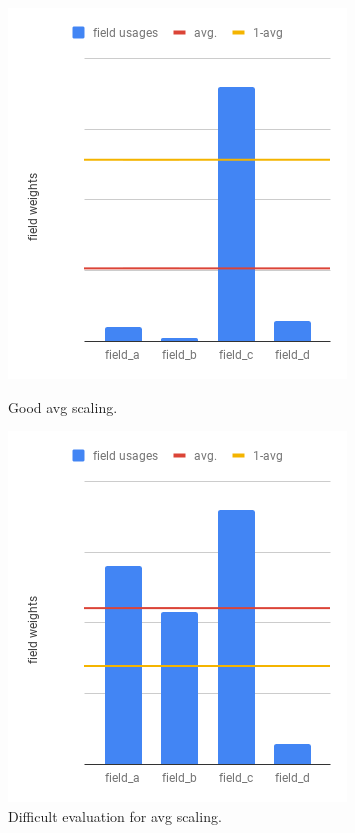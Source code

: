 \begin{figure}[ht]
	\begin{minipage}[b]{0.5\linewidth}
		\centering
		\includegraphics[width=\textwidth,height=.7\textwidth]{PICs/avg_as_delimiter_1}
		\caption{Good avg scaling.}
		\label{avg_delimiter}
	\end{minipage}
	\hspace{0.5cm}
	\begin{minipage}[b]{0.5\linewidth}
		\centering
		\includegraphics[width=\textwidth,height=.7\textwidth]{PICs/avg_as_delimiter_2}
		\caption{Difficult evaluation for avg scaling.}
		\label{avg_delimiter_bad}
	\end{minipage}
	\hspace{0.5cm}
	\begin{minipage}[b]{0.5\linewidth}

\end{minipage}
\end{figure}
